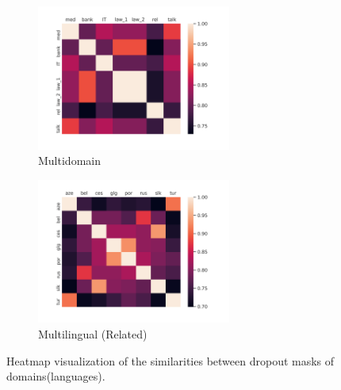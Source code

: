 \documentclass[11pt]{article}
\begin{document}
\begin{figure}[h!]
\begin{subfigure}{0.5\textwidth}
  \centering
  \includegraphics[width=0.7\textwidth]{multi_domain_heatmap.png}  
  \caption{Multidomain}
  \label{fig:md-heatmap}
\end{subfigure}
\begin{subfigure}{0.5\textwidth}
  \centering
  \includegraphics[width=0.7\textwidth]{multilingual_heatmap.png}  
  \caption{Multilingual (Related)}
  \label{fig:ml-heatmap}
\end{subfigure}
\caption{Heatmap visualization of the similarities between dropout masks of domains(languages).}
\label{fig:heatmap}
\end{figure}
\end{document}
